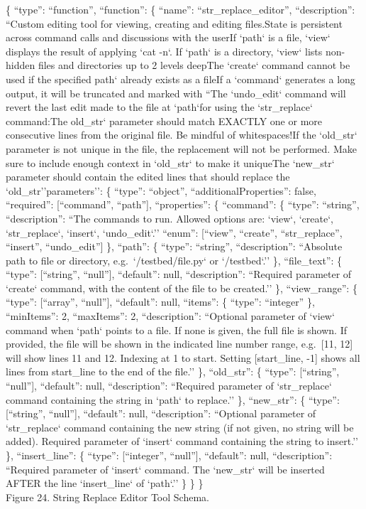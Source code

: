 \documentclass[
  10
]{article}
\newcounter{none} %
\begin{document}
\{ ``type'': ``function'', ``function'': \{ ``name'':
``str\_replace\_editor'', ``description'': ``Custom editing tool for
viewing, creating and editing files.\n* State is persistent across
command calls and discussions with the user\n* If `path` is a file,
`view` displays the result of applying `cat -n`. If `path` is a
directory, `view` lists non-hidden files and directories up to 2 levels
deep\n* The `create` command cannot be used if the specified path`
already exists as a file\n* If a `command` generates a long output, it
will be truncated and marked with ``\n* The `undo\_edit` command will
revert the last edit made to the file at `path`\n\nNotes for using the
`str\_replace` command:\n* The old\_str` parameter should match EXACTLY
one or more consecutive lines from the original file. Be mindful of
whitespaces!\n* If the `old\_str` parameter is not unique in the file,
the replacement will not be performed. Make sure to include enough
context in `old\_str` to make it unique\n* The `new\_str` parameter
should contain the edited lines that should replace the
`old\_str''parameters'': \{ ``type'': ``object'',
``additionalProperties'': false, ``required'': {[}``command'',
``path''{]}, ``properties'': \{ ``command'': \{ ``type'': ``string'',
``description'': ``The commands to run. Allowed options are: `view`,
`create`, `str\_replace`, `insert`, `undo\_edit`.'' ``enum'':
{[}``view'', ``create'', ``str\_replace'', ``insert'', ``undo\_edit''{]}
\}, ``path'': \{ ``type'': ``string'', ``description'': ``Absolute path
to file or directory, e.g.~`/testbed/file.py` or `/testbed`.'' \},
``file\_text'': \{ ``type'': {[}``string'', ``null''{]}, ``default'':
null, ``description'': ``Required parameter of `create` command, with
the content of the file to be created.'' \}, ``view\_range'': \{
``type'': {[}``array'', ``null''{]}, ``default'': null, ``items'': \{
``type'': ``integer'' \}, ``minItems'': 2, ``maxItems'': 2,
``description'': ``Optional parameter of `view` command when `path`
points to a file. If none is given, the full file is shown. If provided,
the file will be shown in the indicated line number range, e.g.~{[}11,
12{]} will show lines 11 and 12. Indexing at 1 to start. Setting
{[}start\_line, -1{]} shows all lines from start\_line to the end of the
file.'' \}, ``old\_str'': \{ ``type'': {[}``string'', ``null''{]},
``default'': null, ``description'': ``Required parameter of
`str\_replace` command containing the string in `path` to replace.'' \},
``new\_str'': \{ ``type'': {[}``string'', ``null''{]}, ``default'':
null, ``description'': ``Optional parameter of `str\_replace` command
containing the new string (if not given, no string will be added).
Required parameter of `insert` command containing the string to
insert.'' \}, ``insert\_line'': \{ ``type'': {[}``integer'',
``null''{]}, ``default'': null, ``description'': ``Required parameter of
`insert` command. The `new\_str` will be inserted AFTER the line
`insert\_line` of `path`.'' \} \} \}\\
Figure 24. String Replace Editor Tool Schema.
\end{document}
